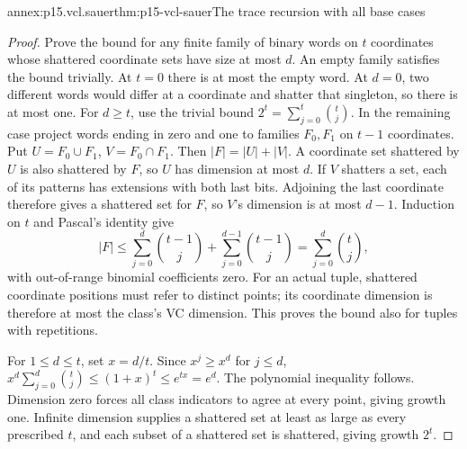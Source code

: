 \begin{annexitem}{annex:p15.vcl.sauer}{thm:p15-vcl-sauer}{The trace recursion with all base cases}
\begin{proof}
Prove the bound for any finite family of binary words on \(t\) coordinates
whose shattered coordinate sets have size at most \(d\). An empty family
satisfies the bound trivially. At \(t=0\) there is at most the empty word.
At \(d=0\), two different words would differ at a coordinate and shatter
that singleton, so there is at most one. For \(d\geq t\), use the
trivial bound \(2^t=\sum_{j=0}^t\binom tj\).
In the remaining case project words ending in zero and one to families
\(F_0,F_1\) on \(t-1\) coordinates. Put \(U=F_0\cup F_1\),
\(V=F_0\cap F_1\). Then \(|F|=|U|+|V|\). A coordinate set
shattered by \(U\) is also shattered by \(F\), so \(U\) has dimension
at most \(d\). If \(V\) shatters a set, each of its patterns has
extensions with both last bits. Adjoining the last coordinate therefore
gives a shattered set for \(F\), so \(V\)'s dimension is at most
\(d-1\). Induction on \(t\) and Pascal's identity give
\[
 |F|\leq\sum_{j=0}^d\binom{t-1}j+
             \sum_{j=0}^{d-1}\binom{t-1}j=\sum_{j=0}^d\binom tj,
\]
with out-of-range binomial coefficients zero. For an actual tuple,
shattered coordinate positions must refer to distinct points; its
coordinate dimension is therefore at most the class's VC dimension.
This proves the bound also for tuples with repetitions.

For \(1\leq d\leq t\), set \(x=d/t\). Since \(x^j\geq x^d\)
for \(j\leq d\),
\(x^d\sum_{j=0}^d\binom tj\leq(1+x)^t\leq e^{tx}=e^d\).
The polynomial inequality follows. Dimension zero forces all class
indicators to agree at every point, giving growth one. Infinite dimension
supplies a shattered set at least as large as every prescribed \(t\),
and each subset of a shattered set is shattered, giving growth \(2^t\).
\end{proof}
\end{annexitem}

